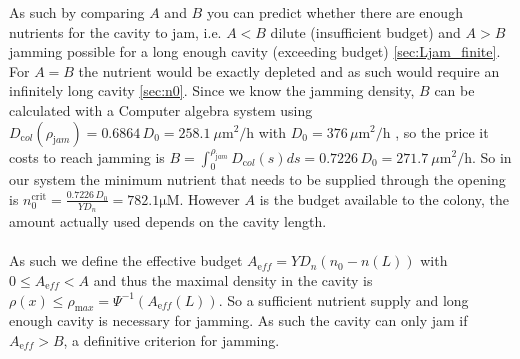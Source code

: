 \documentclass[11pt,a4paper]{report}
\begin{document}
	As such by comparing $A$ and $B$ you can predict whether there are enough nutrients for the cavity to jam, i.e. $A<B$ dilute (insufficient budget) and $A>B$ jamming possible for a long enough cavity (exceeding budget) \ref{sec:Ljam_finite}. For $A=B$ the nutrient would be exactly depleted and as such would require an infinitely long cavity \ref{sec:n0}.
	Since we know the jamming density, $B$ can be calculated with a Computer algebra system using $D_{\mathrm col}(\rho_{\mathrm jam})=0.6864\,D_0=258.1\ \mu\mathrm{m}^2/\mathrm{h}$ with $D_0=376 \,\mu\mathrm{m}^2/\mathrm{h}$ \cite{Karita}, so the price it costs to reach jamming is $B=\int_0^{\rho_{\mathrm jam}}\!D_{\mathrm col}(s) ds=0.7226\,D_0=271.7\ \mu\mathrm{m}^2/\mathrm{h}$. So in our system the minimum nutrient that needs to be supplied through the opening is $n_0^{\mathrm{crit}}=\frac{0.7226\,D_0}{Y D_n}=782.1 \mathrm{\mu M}$. However $A$ is the budget available to the colony, the amount actually used depends on the cavity length. \\
	\\As such we define the effective budget $A_{\mathrm eff}=YD_n(n_0-n(L))$ with $0\le A_{\mathrm eff}<A$ and thus the maximal density in the cavity is $\rho(x)\le\rho_{\mathrm max}=\Psi^{-1}(A_{\mathrm eff}(L))$. So a sufficient nutrient supply and long enough cavity is necessary for jamming. As such the cavity can only jam if $A_{\mathrm eff}>B$, a definitive criterion for jamming.
\end{document}
